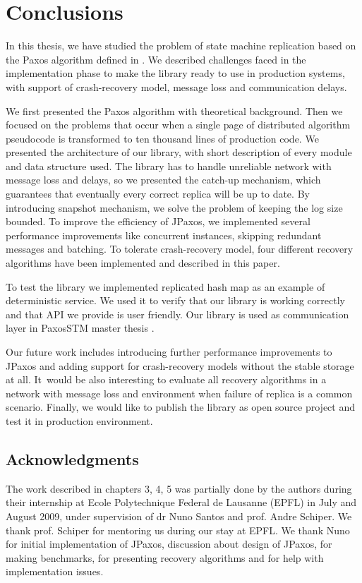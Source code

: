 \chapter{Conclusions}

In this thesis, we have studied the problem of state machine replication based
on the Paxos algorithm defined in \cite{Lam98}. We described challenges faced in
the implementation phase to make the library ready to use in production systems,
with support of crash-recovery model, message loss and communication delays.

We first presented the Paxos algorithm with theoretical background. Then we
focused on the problems that occur when a single page of distributed algorithm pseudocode 
is transformed to ten thousand lines of production code. We presented
the architecture of our library, with short description of every module and data
structure used. The library has to handle unreliable network with message
loss and delays, so we presented the catch-up mechanism, which guarantees that
eventually every correct replica will be up to date. By introducing snapshot
mechanism, we solve the problem of keeping the log size bounded. To improve the efficiency of JPaxos, we implemented several performance improvements like concurrent
instances, skipping redundant messages and batching. To tolerate crash-recovery
model, four different recovery algorithms have been implemented and described in
this paper.

To test the library we implemented replicated hash map as an example of
deterministic service. We used it to verify that our library is working
correctly and that API we provide is user friendly. Our library is used as 
communication layer in PaxosSTM master thesis \cite{Tad10}.

Our future work includes introducing further performance improvements to JPaxos and
adding support for crash-recovery models without the stable storage at all. It~would be also interesting to evaluate all recovery algorithms in a network with
message loss and environment when failure of replica is a common scenario.
Finally, we would like to publish the library as open source project and test it
in production environment.

\section*{Acknowledgments}

The work described in chapters 3, 4, 5 was partially done by the authors during
their internship at Ecole Polytechnique Federal de Lausanne (EPFL) in July and
August 2009, under supervision of dr Nuno Santos and prof. Andre Schiper. We
thank prof. Schiper for mentoring us during our stay at EPFL. We thank Nuno for
initial implementation of JPaxos, discussion about design of JPaxos, for making
benchmarks, for presenting recovery algorithms and for help with implementation
issues. 

